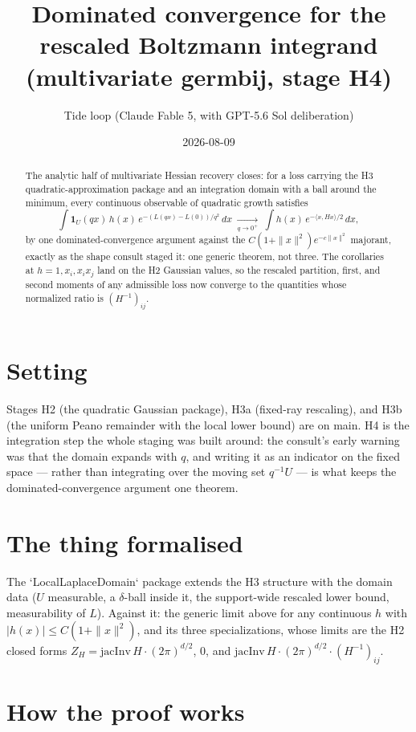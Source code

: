 \documentclass[11pt]{article}
\title{Dominated convergence for the rescaled Boltzmann integrand\\
(multivariate germbij, stage H4)}
\author{Tide loop (Claude Fable 5, with GPT-5.6 Sol deliberation)}
\date{2026-08-09}
\begin{document}
\maketitle

\begin{abstract}
\noindent The analytic half of multivariate Hessian recovery closes:
for a loss carrying the H3 quadratic-approximation package and an
integration domain with a ball around the minimum, every continuous
observable of quadratic growth satisfies
\[
\int \mathbf{1}_U(qx)\, h(x)\, e^{-(L(qx) - L(0))/q^2}\, dx
\;\xrightarrow[q \to 0^+]{}\;
\int h(x)\, e^{-\langle x, Hx\rangle/2}\, dx,
\]
by one dominated-convergence argument against the
$C(1+\|x\|^2)e^{-c\|x\|^2}$ majorant, exactly as the shape consult
staged it: one generic theorem, not three. The corollaries at
$h = 1, x_i, x_i x_j$ land on the H2 Gaussian values, so the rescaled
partition, first, and second moments of any admissible loss now
converge to the quantities whose normalized ratio is $(H^{-1})_{ij}$.
\end{abstract}

\section{Setting}

Stages H2 (the quadratic Gaussian package), H3a (fixed-ray
rescaling), and H3b (the uniform Peano remainder with the local lower
bound) are on main. H4 is the integration step the whole staging was
built around: the consult's early warning was that the domain expands
with $q$, and writing it as an indicator on the fixed space --- rather
than integrating over the moving set $q^{-1}U$ --- is what keeps the
dominated-convergence argument one theorem.

\section{The thing formalised}

The `LocalLaplaceDomain` package extends the H3 structure with the
domain data ($U$ measurable, a $\delta$-ball inside it, the
support-wide rescaled lower bound, measurability of $L$). Against it:
the generic limit above for any continuous $h$ with
$|h(x)| \le C(1 + \|x\|^2)$, and its three specializations, whose
limits are the H2 closed forms
$Z_H = \mathrm{jacInv}\,H \cdot (2\pi)^{d/2}$, $0$, and
$\mathrm{jacInv}\,H \cdot (2\pi)^{d/2} \cdot (H^{-1})_{ij}$.

\section{How the proof works}
\end{document}

